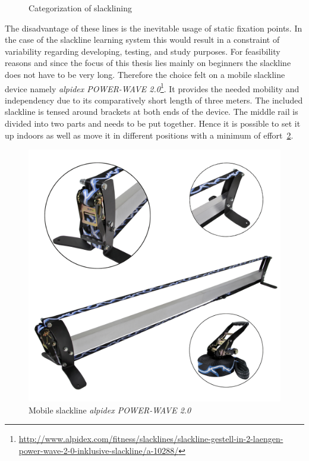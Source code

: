 \begin{figure}[htb]
\begin{minipage}[t]{0.45\linewidth}
		\label{fig:urbanline}
	\end{minipage}
	\caption{Categorization of slacklining}
	\label{fig:slacklineCategorization}
\end{figure}

The disadvantage of these lines is the inevitable usage of static fixation points. In the case of the slackline learning system this would result in a constraint of variability regarding developing, testing, and study purposes. For feasibility reasons and since the focus of this thesis lies mainly on beginners the slackline does not have to be very long. Therefore the choice felt on a mobile slackline device namely \textit{alpidex POWER-WAVE 2.0}\footnote{\url{http://www.alpidex.com/fitness/slacklines/slackline-gestell-in-2-laengen-power-wave-2-0-inklusive-slackline/a-10288/}}. It provides the needed mobility and independency due to its comparatively short length of three meters. The included slackline is tensed around brackets at both ends of the device. The middle rail is divided into two parts and needs to be put together. Hence it is possible to set it up indoors as well as move it in different positions with a minimum of effort~\ref{fig:3_2_mobileSlackline}.
\begin{figure}[htb]
	\centering
	\begin{minipage}[t]{1\linewidth}
		\centering
		\includegraphics[width=0.44\linewidth]{Pictures/3_2_mobileSlackline}
		\caption{Mobile slackline \textit{alpidex POWER-WAVE 2.0}~\cite{alpidex2017-ms}}
		\label{fig:3_2_mobileSlackline}
	\end{minipage}
\end{figure}
